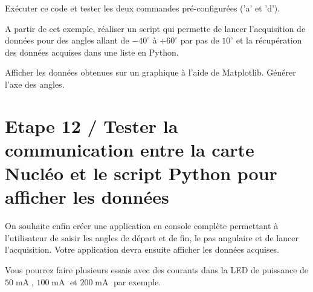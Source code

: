 \documentclass[a4paper,11pt,titlepage]{article} %
\begin{document}
\medskip

\Manip Exécuter ce code et tester les deux commandes pré-configurées ('a' et 'd').

\Manip A partir de cet exemple, réaliser un script qui permette de lancer l'acquisition de données pour des angles allant de $-40^\circ{}$ à $+60^\circ{}$ par pas de $10^\circ{}$ et la récupération des données acquises dans une liste en Python.

\Manip Afficher les données obtenues sur un graphique à l'aide de Matplotlib. Générer l'axe des angles.


\section{Etape 12 / Tester la communication entre la carte Nucléo et le script Python pour afficher les données}

On souhaite enfin créer une application en console complète permettant à l'utilisateur de saisir les angles de départ et de fin, le pas angulaire et de lancer l'acquisition. Votre application devra ensuite afficher les données acquises.

Vous pourrez faire plusieurs essais avec des courants dans la LED de puissance de $50\operatorname{mA}$, $100\operatorname{mA}$ et $200\operatorname{mA}$ par exemple.


\newpage
\end{document}
